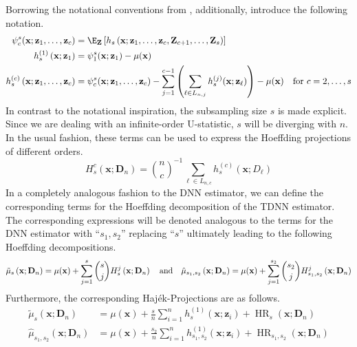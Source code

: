 Borrowing the notational conventions from \citet{lee_u-statistics_2019}, additionally, introduce the following notation.
\begin{align}
	\psi_{c}^{s}(\mathbf{x}; \mathbf{z}_{1}, \dotsc, \mathbf{z}_{c})
	 & = \E_{\mathbf{Z}}\left[h_{s}\left(\mathbf{x}; \mathbf{z}_{1}, \dotsc, \mathbf{z}_{c}, \mathbf{Z}_{c+1}, \dotsc, \mathbf{Z}_{s}\right)\right]                                            \\
	h_{s}^{(1)}\left(\mathbf{x}; \mathbf{z}_{1}\right)
	 & = \psi_{1}^{s}(\mathbf{x}; \mathbf{z}_{1}) - \mu(\mathbf{x})                                                                                                                            \\
	h_{s}^{(c)}\left(\mathbf{x}; \mathbf{z}_{1}, \dotsc, \mathbf{z}_{c}\right)
	 & = \psi_{c}^{s}(\mathbf{x}; \mathbf{z}_{1}, \dotsc, \mathbf{z}_{c}) - \sum_{j = 1}^{c-1}\left(\sum_{\ell \in L_{n,j}}h_{s}^{(j)}(\mathbf{x}; \mathbf{z}_{\ell})\right) - \mu(\mathbf{x})
	\quad \text{for } c = 2, \dotsc, s
\end{align}
In contrast to the notational inspiration, the subsampling size $s$ is made explicit.
Since we are dealing with an infinite-order U-statistic, $s$ will be diverging with $n$.
In the usual fashion, these terms can be used to express the Hoeffding projections of different orders.
\begin{equation}
	H_{s}^{c}\left(\mathbf{x}; \mathbf{D}_n\right)
	= \binom{n}{c}^{-1} \sum_{\ell \in L_{n,c}} h^{(c)}_{s}(\mathbf{x}; D_{\ell})
\end{equation}
In a completely analogous fashion to the DNN estimator, we can define the corresponding terms for the Hoeffding decomposition of the TDNN estimator.
The corresponding expressions will be denoted analogous to the terms for the DNN estimator with ``$s_1, s_2$'' replacing ``$s$'' ultimately leading to the following Hoeffding decompositions.
\begin{equation}
	\tilde{\mu}_{s}\left(\mathbf{x}; \mathbf{D}_n\right)
	= \mu(\mathbf{x}) + \sum_{j = 1}^{s}\binom{s}{j}H_{s}^{j}\left(\mathbf{x}; \mathbf{D}_n\right)\\
	\quad \text{and} \quad
	\hat{\mu}_{s_1, s_2}\left(\mathbf{x}; \mathbf{D}_n\right)
	= \mu(\mathbf{x}) + \sum_{j = 1}^{s_2}\binom{s_2}{j}H_{s_1, s_2}^{j}\left(\mathbf{x}; \mathbf{D}_n\right)
\end{equation}
Furthermore, the corresponding Haj\'ek-Projections are as follows.
\begin{equation}
	\begin{aligned}
		\tilde{\mu}_{s}\left(\mathbf{x}; \mathbf{D}_n\right)
		 & = \mu(\mathbf{x}) + \frac{s}{n}\sum_{i = 1}^{n}h^{(1)}_{s}(\mathbf{x}; \mathbf{z}_{i})
		+ \operatorname{HR}_{s}(\mathbf{x}; \mathbf{D}_n)                                                   \\
		\hat{\mu}_{s_1, s_2}\left(\mathbf{x}; \mathbf{D}_n\right)
		 & = \mu(\mathbf{x}) + \frac{s_2}{n}\sum_{i = 1}^{n} h^{(1)}_{s_1, s_2}(\mathbf{x}; \mathbf{z}_{i})
		+ \operatorname{HR}_{s_1, s_2}(\mathbf{x}; \mathbf{D}_n)
	\end{aligned}
\end{equation}
